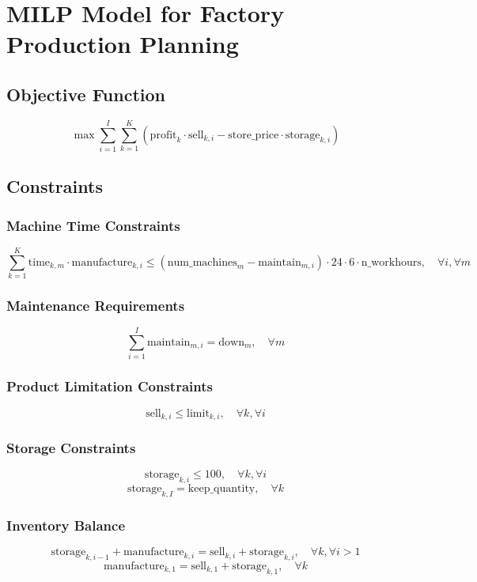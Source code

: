 \documentclass{article}
\begin{document}
\section*{MILP Model for Factory Production Planning}

\subsection*{Objective Function}
\[
\max \sum_{i=1}^{I} \sum_{k=1}^{K} \left( \text{profit}_k \cdot \text{sell}_{k,i} - \text{store\_price} \cdot \text{storage}_{k,i} \right)
\]

\subsection*{Constraints}

\subsubsection*{Machine Time Constraints}
\[
\sum_{k=1}^{K} \text{time}_{k,m} \cdot \text{manufacture}_{k,i} \leq \left( \text{num\_machines}_m - \text{maintain}_{m,i} \right) \cdot 24 \cdot 6 \cdot \text{n\_workhours}, \quad \forall i, \forall m
\]

\subsubsection*{Maintenance Requirements}
\[
\sum_{i=1}^{I} \text{maintain}_{m,i} = \text{down}_{m}, \quad \forall m
\]

\subsubsection*{Product Limitation Constraints}
\[
\text{sell}_{k,i} \leq \text{limit}_{k,i}, \quad \forall k, \forall i
\]

\subsubsection*{Storage Constraints}
\[
\text{storage}_{k,i} \leq 100, \quad \forall k, \forall i
\]
\[
\text{storage}_{k,I} = \text{keep\_quantity}, \quad \forall k
\]

\subsubsection*{Inventory Balance}
\[
\text{storage}_{k,i-1} + \text{manufacture}_{k,i} = \text{sell}_{k,i} + \text{storage}_{k,i}, \quad \forall k, \forall i > 1
\]
\[
\text{manufacture}_{k,1} = \text{sell}_{k,1} + \text{storage}_{k,1}, \quad \forall k
\]
\end{document}
